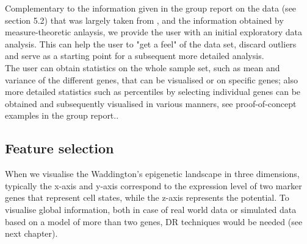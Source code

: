 \documentclass[journal, a4paper]{IEEEtran}
\begin{document}
Complementary to the information given in the group report on the data (see section 5.2) that was largely taken from \cite{singlecelldata}, and the information obtained by measure-theoretic anlaysis, we provide the user with an initial exploratory data analysis. This can help the user to "get a feel" of the data set, discard outliers and serve as a starting point for a subsequent more detailed analysis. \\
The user can obtain statistics on the whole sample set, such as mean and variance of the different genes, that can be visualised or on specific genes; also more detailed statistics such as percentiles by selecting individual genes can be obtained and subsequently visualised in various manners, see proof-of-concept examples in the group report..\\







\subsection{Feature selection}

When we visualise the Waddington's epigenetic landscape in three dimensions, typically the x-axis and y-axis correspond to the expression level of two marker genes that represent cell states, while the z-axis represents the potential. To visualise global information, both in case of real world data or simulated data based on a model of more than two genes, DR techniques would be needed (see next chapter).\\
\end{document}
